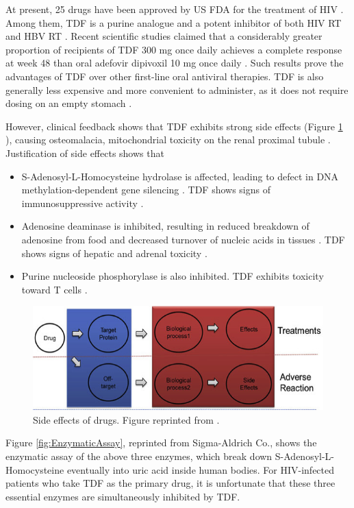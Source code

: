 At present, 25 drugs have been approved by US FDA for the treatment of HIV \citep{300-2010}. Among them, TDF is a purine analogue \citep{301-2010} and a potent inhibitor of both HIV RT and HBV RT \citep{165-2008}. Recent scientific studies claimed that a considerably greater proportion of recipients of TDF 300 mg once daily achieves a complete response at week 48 than oral adefovir dipivoxil 10 mg once daily \citep{165-2008}. Such results prove the advantages of TDF over other first-line oral antiviral therapies. TDF is also generally less expensive and more convenient to administer, as it does not require dosing on an empty stomach \citep{159-2009}.

However, clinical feedback shows that TDF exhibits strong side effects (Figure \ref{fig:SideEffect} \citep{658-2011}), causing osteomalacia, mitochondrial toxicity on the renal proximal tubule \citep{185-2006,186-2003}. Justification of side effects shows that
\begin{itemize}
\item S-Adenosyl-L-Homocysteine hydrolase is affected, leading to defect in DNA methylation-dependent gene silencing \citep{182-2005}. TDF shows signs of immunosuppressive activity \citep{183-2007}.
\item Adenosine deaminase is inhibited, resulting in reduced breakdown of adenosine from food and decreased turnover of nucleic acids in tissues \citep{184-2005}. TDF shows signs of hepatic and adrenal toxicity \citep{187-2000}.
\item Purine nucleoside phosphorylase is also inhibited. TDF exhibits toxicity toward T cells \citep{188-1981}.
\end{itemize}

\begin{figure}
\centering
\includegraphics[width=\textwidth]{VirtualScreening/Figures/SideEffect.png}
\caption{Side effects of drugs. Figure reprinted from \citep{658-2011}.}
\label{fig:SideEffect}
\end{figure}

Figure \ref{fig:EnzymaticAssay}, reprinted from Sigma-Aldrich Co., shows the enzymatic assay of the above three enzymes, which break down S-Adenosyl-L-Homocysteine eventually into uric acid inside human bodies. For HIV-infected patients who take TDF as the primary drug, it is unfortunate that these three essential enzymes are simultaneously inhibited by TDF.

